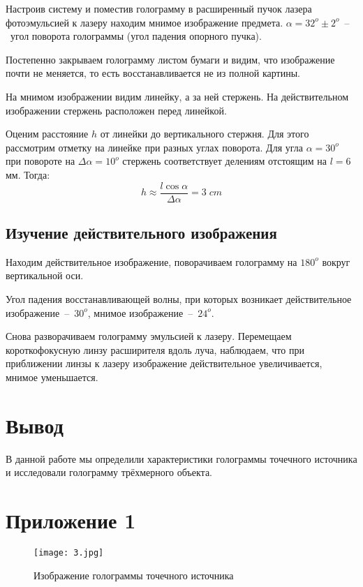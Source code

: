 \documentclass[a4paper, 12pt]{article}
\begin{document}
\noindent Настроив систему и поместив голограмму в расширенный пучок лазера фотоэмульсией к лазеру находим мнимое изображение предмета. 
$ \alpha = 32^o \pm 2^o $~--~угол поворота голограммы (угол падения опорного пучка).

\noindent Постепенно закрываем голограмму листом бумаги и видим, что изображение почти не меняется, то есть восстанавливается не из полной картины.

\noindent На мнимом изображении видим линейку, а за ней стержень. На действительном изображении стержень расположен перед линейкой. 

\noindent Оценим расстояние $h$ от линейки до вертикального стержня. Для этого рассмотрим отметку на линейке при разных углах поворота. Для угла $\alpha = 30^o$ при повороте на $\Delta \alpha =  10^o$ стержень соответствует делениям отстоящим на $l = 6$ мм. Тогда: \[h \approx \frac{l \cos \alpha}{\Delta \alpha} = 3 \; cm \]


\subsection{Изучение действительного изображения}

\noindent Находим действительное изображение, поворачиваем голограмму на $180^o$ вокруг вертикальной оси.

\noindent Угол падения восстанавливающей волны, при которых возникает действительное изображение~--~$30^o$, мнимое изображение~--~$24^o$.

\noindent Снова разворачиваем голограмму эмульсией к лазеру. Перемещаем короткофокусную линзу расширителя вдоль луча, наблюдаем, что при приближении линзы к лазеру изображение действительное увеличивается, мнимое уменьшается.


\section*{Вывод}  
	\noindent В данной работе мы определили характеристики голограммы точечного источника и исследовали голограмму трёхмерного объекта.


\section*{Приложение 1}  
\begin{figure}[H]
	\centering
	\texttt{[image: 3.jpg]}
	\caption{Изображение голограммы точечного источника}
\end{figure}
\end{document}
